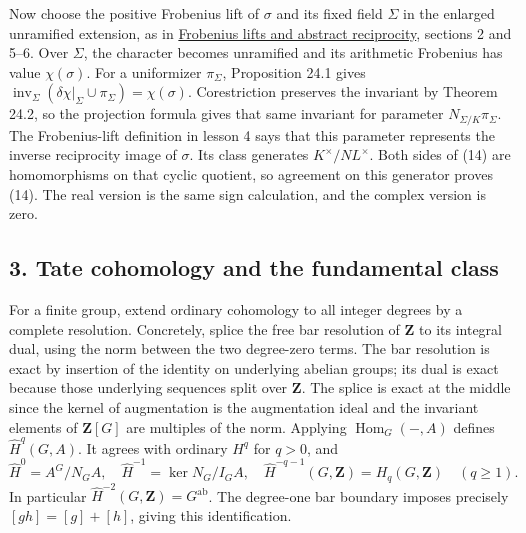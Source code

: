 \documentclass[11pt,a4paper]{article}
\begin{document}
Now choose the positive Frobenius lift of \(\sigma\) and its fixed field
\(\Sigma\) in the enlarged unramified extension, as in
\href{../frobenius-lifts-and-abstract-reciprocity.html}{Frobenius lifts
and abstract reciprocity}, sections 2 and 5--6. Over \(\Sigma\), the
character becomes unramified and its arithmetic Frobenius has value
\(\chi(\sigma)\). For a uniformizer \(\pi_\Sigma\), Proposition 24.1
gives
\(\operatorname{inv}_\Sigma(\delta\chi|_\Sigma\cup\pi_\Sigma)=\chi(\sigma)\).
Corestriction preserves the invariant by Theorem 24.2, so the projection
formula gives that same invariant for parameter
\(N_{\Sigma/K}\pi_\Sigma\). The Frobenius-lift definition in lesson 4
says that this parameter represents the inverse reciprocity image of
\(\sigma\). Its class generates \(K^\times/NL^\times\). Both sides of
(14) are homomorphisms on that cyclic quotient, so agreement on this
generator proves (14). The real version is the same sign calculation,
and the complex version is zero.

\subsection{3. Tate cohomology and the fundamental
class}\label{tate-cohomology-and-the-fundamental-class}

For a finite group, extend ordinary cohomology to all integer degrees by
a complete resolution. Concretely, splice the free bar resolution of
\(\mathbf Z\) to its integral dual, using the norm between the two
degree-zero terms. The bar resolution is exact by insertion of the
identity on underlying abelian groups; its dual is exact because those
underlying sequences split over \(\mathbf Z\). The splice is exact at
the middle since the kernel of augmentation is the augmentation ideal
and the invariant elements of \(\mathbf Z[G]\) are multiples of the
norm. Applying \(\operatorname{Hom}_G(-,A)\) defines
\(\widehat H^q(G,A)\). It agrees with ordinary \(H^q\) for \(q>0\), and
\[
\widehat H^0=A^G/N_GA,\quad
\widehat H^{-1}=\ker N_G/I_GA,\quad
\widehat H^{-q-1}(G,\mathbf Z)=H_q(G,\mathbf Z)\quad(q\geq1).
\tag{15}
\] In particular \(\widehat H^{-2}(G,\mathbf Z)=G^{\mathrm{ab}}\). The
degree-one bar boundary imposes precisely \([gh]=[g]+[h]\), giving this
identification.
\end{document}
